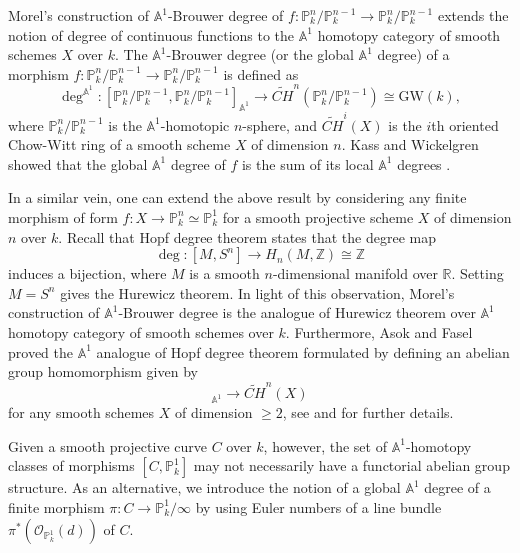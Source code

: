 \documentclass[12pt, reqno]{amsart}
\theoremstyle{definition}
\newcommand{\A}{\mathbb{A}} %
\newcommand{\Proj}{\mathbb{P}} %
\newcommand{\GW}{\mathrm{GW}} %
\newcommand{\Adeg}{\deg^{\mathbb{A}^1}} %
\newcommand{\Oh}{\mathscr{O}} %
\begin{document}
Morel's construction of $\A^1$-Brouwer degree of $f: \Proj^n_k/\Proj^{n-1}_k \to \Proj^n_k/\Proj^{n-1}_k$ extends the notion of degree of continuous functions to the $\A^1$ homotopy category of smooth schemes $X$ over $k$. The $\A^1$-Brouwer degree (or the global $\A^1$ degree) of a morphism $f: \Proj^n_k/\Proj^{n-1}_k \to \Proj^n_k/\Proj^{n-1}_k$ is defined as
\begin{equation*}
    \Adeg: [\Proj^n_k/\Proj^{n-1}_k, \Proj^n_k/\Proj^{n-1}_k]_{\A^1} \to  \widetilde{CH}^n(\Proj^n_k/\Proj^{n-1}_k) \cong \GW(k),
\end{equation*}
where $\Proj^n_k/\Proj^{n-1}_k$ is the $\A^1$-homotopic $n$-sphere, and $\widetilde{CH}^i(X)$ is the $i$th oriented Chow-Witt ring of a smooth scheme $X$ of dimension $n$. Kass and Wickelgren showed that the global $\A^1$ degree of $f$ is the sum of its local $\A^1$ degrees \cite[Proposition 14]{kwEKL}.

In a similar vein, one can extend the above result by considering any finite morphism of form $f: X \to \Proj^n_k \simeq \Proj^1_k$ for a smooth projective scheme $X$ of dimension $n$ over $k$. Recall that Hopf degree theorem states that the degree map 
\begin{equation*}
    \deg: [M, S^n] \to H_n(M, \mathbb{Z}) \cong \mathbb{Z}
\end{equation*}
induces a bijection, where $M$ is a smooth $n$-dimensional manifold over $\mathbb{R}$. Setting $M = S^n$ gives the Hurewicz theorem. In light of this observation, Morel's construction of $\A^1$-Brouwer degree is the analogue of Hurewicz theorem over $\A^1$ homotopy category of smooth schemes over $k$. Furthermore, Asok and Fasel proved the $\A^1$ analogue of Hopf degree theorem formulated by defining an abelian group homomorphism given by
\begin{equation*}
    [X, \Proj^n_k / \Proj^{n-1}_k]_{\A^1} \to \widetilde{CH}^n(X)
\end{equation*}
for any smooth schemes $X$ of dimension $\geq 2$, see \cite[Theorem 2]{adf17} and \cite[Theorem 1]{af18} for further details.

Given a smooth projective curve $C$ over $k$, however, the set of $\A^1$-homotopy classes of morphisms $[C, \Proj^1_k]$ may not necessarily have a functorial abelian group structure. As an alternative, we introduce the notion of a global $\A^1$ degree of a finite morphism $\pi: C \to \Proj^1_k/\infty$ by using Euler numbers of a line bundle $\pi^*(\Oh_{\Proj^1_k}(d))$ of $C$. 
\end{document}
